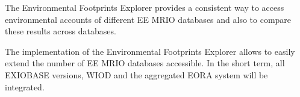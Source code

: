 The Environmental Footprints Explorer provides a consistent way to access environmental accounts of different EE MRIO databases and also to compare these results across databases.

The implementation of the Environmental Footprints Explorer allows to easily extend the number of EE MRIO databases accessible. In the short term, all EXIOBASE versions, WIOD and the aggregated EORA system will be integrated. 
